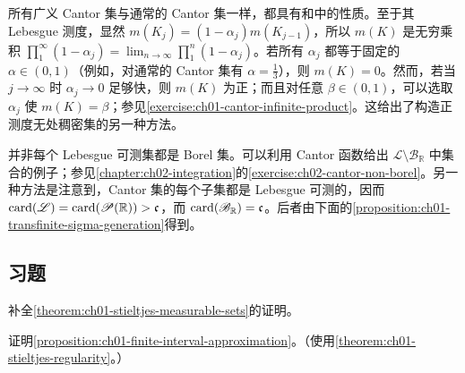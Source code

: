 \documentclass[../../main.tex]{subfiles}%
\begin{document}
\begin{remark}
所有广义 Cantor 集与通常的 Cantor 集一样，都具有和中的性质。至于其 Lebesgue 测度，显然 $m(K_j)=(1-\alpha_j)m(K_{j-1})$，所以 $m(K)$ 是无穷乘积 $\prod_1^\infty(1-\alpha_j)=\lim_{n\to\infty}\prod_1^n(1-\alpha_j)$。若所有 $\alpha_j$ 都等于固定的 $\alpha\in(0,1)$（例如，对通常的 Cantor 集有 $\alpha=\frac13$），则 $m(K)=0$。然而，若当 $j\to\infty$ 时 $\alpha_j\to0$ 足够快，则 $m(K)$ 为正；而且对任意 $\beta\in(0,1)$，可以选取 $\alpha_j$ 使 $m(K)=\beta$；参见\cref{exercise:ch01-cantor-infinite-product}。这给出了构造正测度无处稠密集的另一种方法。
\end{remark}



\begin{remark}
并非每个 Lebesgue 可测集都是 Borel 集。可以利用 Cantor 函数给出 $\mathscr{L}\setminus\mathscr{B}_{\mathbb{R}}$ 中集合的例子；参见\cref{chapter:ch02-integration}的\cref{exercise:ch02-cantor-non-borel}。另一种方法是注意到，Cantor 集的每个子集都是 Lebesgue 可测的，因而 $\operatorname{card}(\mathscr{L})=\operatorname{card}(\mathscr{P}(\mathbb{R}))>\mathfrak{c}$，而 $\operatorname{card}(\mathscr{B}_{\mathbb{R}})=\mathfrak{c}$。后者由下面的\cref{proposition:ch01-transfinite-sigma-generation}得到。
\end{remark}


\subsection*{习题}

\begin{exercise}\label{exercise:ch01-measurable-set-characterization-proof}
补全\cref{theorem:ch01-stieltjes-measurable-sets}的证明。
\end{exercise}

\begin{exercise}\label{exercise:ch01-finite-interval-approximation-proof}
证明\cref{proposition:ch01-finite-interval-approximation}。（使用\cref{theorem:ch01-stieltjes-regularity}。）
\end{exercise}
\end{document}
